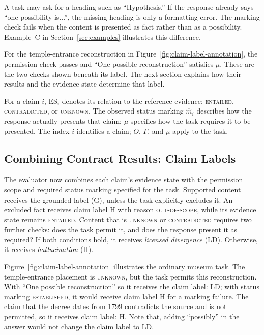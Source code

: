 \documentclass{clv2025}
\newcommand{\LD}{\textsc{LD}}
\newcommand{\Hall}{\textsc{H}}
\newcommand{\Grd}{\textsc{G}}
\begin{document}
A task may ask for a heading such as ``Hypothesis.'' If the response
already says ``one possibility is...'', the missing heading is only a
formatting error. The marking check fails when the content is presented
as fact rather than as a possibility. Example~C in
Section~\ref{sec:examples} illustrates this difference.

For the temple-entrance reconstruction in
Figure~\ref{fig:claim-label-annotation}, the permission check passes and
``One possible reconstruction'' satisfies $\mu$. These are the two checks
shown beneath its label. The next section explains how their results and
the evidence state determine that label.

For a claim $i$, $\mathrm{ES}_i$ denotes its relation to the reference evidence:
\textsc{entailed}, \textsc{contradicted}, or \textsc{unknown}.
The observed status marking $\widehat{m}_i$ describes how the response actually
presents that claim; $\mu$ specifies how the task requires it to be presented.
The index $i$ identifies a claim; $O$, $\Gamma$, and $\mu$ apply to the task.



\subsection{Combining Contract Results: Claim Labels}\label{subsec:rule}

The evaluator now combines each claim's evidence state with the permission
scope and required status marking specified for the task. Supported content receives
the grounded label (\Grd), unless the task explicitly excludes it. An
excluded fact receives claim label \Hall{} with reason \textsc{out-of-scope}, while its
evidence state remains \textsc{entailed}. Content that is \textsc{unknown}
or \textsc{contradicted} requires two further checks:
does the task permit it, and does the response present it as required?
If both conditions hold, it receives \emph{licensed divergence} (\LD).
Otherwise, it receives \emph{hallucination} (\Hall).

Figure~\ref{fig:claim-label-annotation} illustrates the ordinary museum task.
The temple-entrance placement is \textsc{unknown}, but the task permits this
reconstruction. With ``One possible reconstruction'' so it receives the claim label: \LD{};
with status marking \textsc{established}, it would receive claim label \Hall{} for a marking failure.
The claim that the decree dates from 1799 contradicts the source and is not
permitted, so it receives claim label: \Hall{}. Note that, adding ``possibly'' in the answer would not change the claim label to \LD{}.
\end{document}
